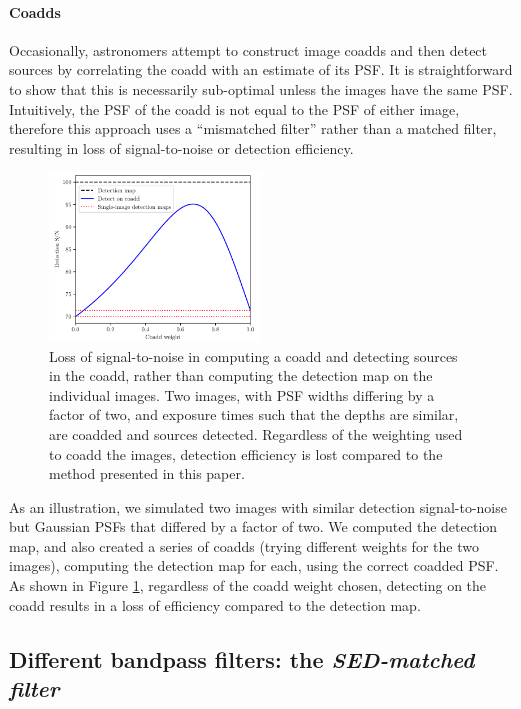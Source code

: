 \documentclass[letterpaper,preprint]{aastex62}
\begin{document}
\paragraph{Coadds}
Occasionally, astronomers attempt to construct image coadds and then
detect sources by correlating the coadd with an estimate of its PSF.
It is straightforward to show that this is necessarily sub-optimal
unless the images have the same PSF.  Intuitively, the PSF of the
coadd is not equal to the PSF of either image, therefore this approach
uses a ``mismatched filter'' rather than a matched filter, resulting
in loss of signal-to-noise or detection efficiency.

\begin{figure}[h]
  \begin{center}
  \includegraphics[width=0.5\textwidth]{dont-coadd}
  \caption{Loss of signal-to-noise in computing a coadd and detecting
    sources in the coadd, rather than computing the detection map on
    the individual images.  Two images, with PSF widths differing by a
    factor of two, and exposure times such that the depths are
    similar, are coadded and sources detected.  Regardless of the
    weighting used to coadd the images, detection efficiency is lost
    compared to the method presented in this paper.\label{fig:dontcoadd}}
  \end{center}
\end{figure}

%
As an illustration, we simulated two images with similar detection
signal-to-noise but Gaussian PSFs that differed by a factor of two.
We computed the detection map, and also created a series of coadds
(trying different weights for the two images), computing the detection
map for each, using the correct coadded PSF.  As shown in Figure
\ref{fig:dontcoadd}, regardless of the coadd weight chosen, detecting
on the coadd results in a loss of efficiency compared to the detection
map.


\subsection{Different bandpass filters: the \emph{SED-matched filter}}
\end{document}

